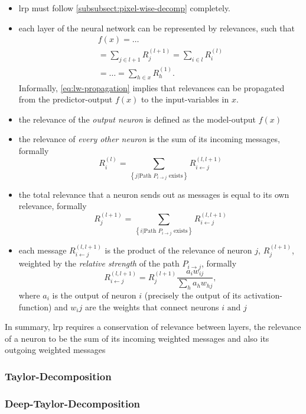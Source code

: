 \begin{itemize}
    \item \gls{lrp} must follow \ref{subsubsect:pixel-wise-decomp} completely.
    \item each layer of the neural network can be represented by relevances, such that 
    \begin{multline}
        f(x) = \dots \\ 
        = \sum_{j\in l+1} R_j^{(l+1)} = \sum_{i\in l} R_i^{(l)} \\
        = \dots = \sum_{h\in x} R_h^{(1)}.\label{eq:lw-propagation}
    \end{multline}
    Informally, \cref{eq:lw-propagation} implies that relevances can be propagated from the predictor-output \(f(x)\) to the input-variables in \(x\).
    \item the relevance of the \textit{output neuron} is defined as the model-output \(f(x)\)
    \item the relevance of \textit{every other neuron} is the sum of its incoming \glspl{message}, formally 
    \begin{equation}
        R_i^{(l)} = \sum_{\left\{ j | \text{Path } P_{i \rightarrow j} \text{ exists}\right\}} R_{i\leftarrow j}^{(l, l+1)}\label{eq:incoming-messages}
    \end{equation}
    \item the total relevance that a neuron sends out as \glspl{message} is equal to its own relevance, formally
    \begin{equation}
        R_j^{(l+1)} = \sum_{\left\{ i | \text{Path } P_{i \rightarrow j} \text{ exists}\right\}} R_{i\leftarrow j}^{(l, l+1)}
    \end{equation}
    \item each \gls{message} \(R_{i\leftarrow j}^{(l,l+1)}\) is the product of the relevance of neuron \(j\), \(R_j^{(l+1)}\), weighted by the \textit{relative strength} of the path \(P_{i\rightarrow j}\), formally
    \begin{equation}
        R_{i\leftarrow j}^{(l,l+1)} = R_{j}^{(l+1)} \frac{a_i w_{ij}}{\sum_h a_h w_{hj}},
    \end{equation}
    where \(a_i\) is the output of neuron \(i\) (precisely the output of its activation-function) and \(w_ij\) are the weights that connect neurons \(i \text{ and } j\)
\end{itemize}
In summary, \gls{lrp} requires a conservation of relevance between layers, the relevance of a neuron to be the sum of its incoming weighted \glspl{message} and also its outgoing weighted \glspl{message} 

\subsubsection{Taylor-Decomposition}
\blindtext[1]

\subsubsection{Deep-Taylor-Decomposition}
\blindtext[1]